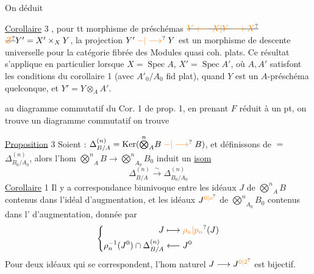 On   déduit

\uline{Corollaire} 3 \quad {} , pour tt morphisme  de préschémas $\deleted{\unsure{Y\longleftarrow X|Y\longrightarrow X}}$   $\deleted{\unsure{Z}}Y'=X'\times_X Y$,  la projection $Y'\mathrel{\unsure{-|\longrightarrow}}Y$ est un morphisme de descente  universelle pour la catégorie fibrée des Modules quasi coh. plats.
Ce résultat s'applique en particulier lorsque $X=\operatorname{Spec}A$, $X'=\operatorname{Spec}A'$, où $A,A'$ satisfont les conditions du corollaire 1 (avec $A'_0/A_0$ fid plat), quand $Y$ est un $A$-préschéma quelconque, et $Y'=Y\otimes_A A'$.


  au diagramme commutatif du Cor. 1 de prop. 1, en  prenant $F$ réduit à un pt, on trouve un diagramme commutatif
on trouve  

\uline{Proposition} 3 \quad {} Soient : $\Delta_{B/A}^{(n)}=\operatorname{Ker}(\overset n{\bigotimes}_A B\mathrel{\unsure{-|\longrightarrow}} B)$,  et définissons de $=$ $\Delta_{B_0/A_0}^{(n)}$, alors l'hom $\overset n{\bigotimes}_A B\longrightarrow\overset n{\bigotimes}_{A_0}B_0$ induit un \uline{isom}
\[
\Delta_{B/A}^{(n)}\xrightarrow{\sim}\Delta_{B_0/A_0}^{(n)}
\]
\uline{Corollaire} 1 \quad Il y a correspondance biunivoque entre les idéaux $J$ de $\overset n{\bigotimes}_A B$ contenus dans l'idéal d'augmentation, et les idéaux $J^{\unsure{0|o}}$ de $\overset n{\bigotimes}_{A_0}B_0$ contenus dans l' d'augmentation, donnée par
\[
\left\{\begin{aligned}
J&\longmapsto\unsure{\rho_n|p_n}(J)\\
\rho_n^{-1}(J^0)\cap\Delta_{B/A}^{(n)}&\longleftarrow J^0
\end{aligned}\right.
\]
Pour deux idéaux  qui se correspondent, l'hom naturel $J\longrightarrow J^{\unsure{0|2}}$ est bijectif.

